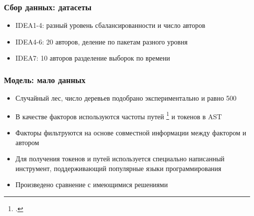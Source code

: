 \documentclass[xcolor=table]{beamer}
\begin{document}
\begin{frame}
	\frametitle{Сбор данных: датасеты}
	\begin{itemize}
		\item IDEA1-4: разный уровень сбалансированности и число авторов
		\item IDEA4-6: 20 авторов, деление по пакетам разного уровня
		\item IDEA7: 10 авторов разделение выборок по времени
	\end{itemize}
	\begin{table}[]
		\centering
		\end{table}
\end{frame}

\begin{frame}
	\frametitle{Модель: мало данных}
	\begin{itemize}
		\item Случайный лес, число деревьев подобрано экспериментально и равно 500
		\item В качестве факторов используются частоты путей \footcite{alon2018general} и токенов в AST
		\item Факторы фильтруются на основе совместной информации между фактором и автором
		\item Для получения токенов и путей используется специально написанный инструмент, поддерживающий популярные языки программирования
		\item Произведено сравнение с имеющимися решениями
	\end{itemize}
\end{frame}
\end{document}
